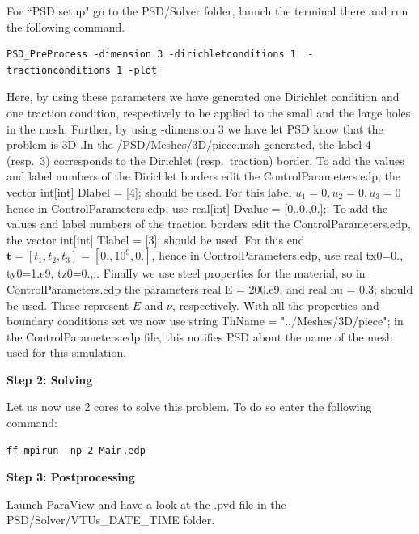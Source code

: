 \documentclass{report}
\begin{document}
For ``PSD setup" go to the {\ttfamily PSD/Solver} folder, launch the terminal there and run the following command.
\begin{lstlisting}[style=Linux]
PSD_PreProcess -dimension 3 -dirichletconditions 1  -tractionconditions 1 -plot
\end{lstlisting}
Here, by using these parameters we have generated one Dirichlet condition and one traction condition, respectively to be applied to the small and the large holes in the mesh. Further, by using {\ttfamily -dimension 3} we have let PSD know that the problem is 3D .In the {\ttfamily /PSD/Meshes/3D/piece.msh} generated, the label 4 (resp.~3) corresponds to the Dirichlet (resp.~traction) border. To add the values and label numbers of the Dirichlet borders edit the  {\ttfamily ControlParameters.edp},  the vector {\ttfamily int[int] Dlabel = [4];} should be used. For this label $u_1=0,u_2=0,u_3=0$ hence in {\ttfamily ControlParameters.edp}, use {\ttfamily real[int]   Dvalue = [0.,0.,0.];}. To add the values and label numbers of the traction borders edit the  {\ttfamily ControlParameters.edp},  the vector {\ttfamily int[int] Tlabel = [3];} should be used. For this end $\mathbf t=[t_1,t_2,t_3]=[0.,10^9,0.]$, hence in {\ttfamily ControlParameters.edp}, use {\ttfamily real  tx0=0., ty0=1.e9, tz0=0.,;}. Finally we use steel properties for the material, so in {\ttfamily ControlParameters.edp} the parameters {\ttfamily real E  = 200.e9;} and {\ttfamily real nu = 0.3;} should be used. These represent $E$ and $\nu$, respectively. With all the properties and boundary conditions set we now use  {\ttfamily string ThName = "../Meshes/3D/piece";} in the {\ttfamily ControlParameters.edp} file, this notifies PSD about the name of the mesh used for this simulation.  

\textbf{Step 2: Solving}

Let us now use 2 cores to solve this problem. To do so enter the following command:

\begin{lstlisting}[style=Linux]
ff-mpirun -np 2 Main.edp
\end{lstlisting}

\textbf{Step 3: Postprocessing}

Launch ParaView and have a look at the  {\ttfamily .pvd} file in the  {\ttfamily PSD/Solver/VTUs\_DATE\_TIME} folder. 
\end{document}
